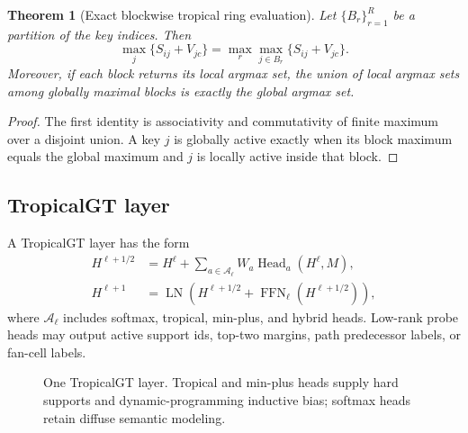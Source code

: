 \documentclass[11pt]{article}
\newtheorem{theorem}[definition]{Theorem}
\newcommand{\calA}{\mathcal{A}}
\begin{document}
\begin{theorem}[Exact blockwise tropical ring evaluation]
Let \(\{B_r\}_{r=1}^R\) be a partition of the key indices.  Then
\begin{equation}
\max_{j}\{S_{ij}+V_{jc}\}=\max_r\max_{j\in B_r}\{S_{ij}+V_{jc}\}.
\end{equation}
Moreover, if each block returns its local argmax set, the union of local argmax sets among globally maximal blocks is exactly the global argmax set.
\end{theorem}
\begin{proof}
The first identity is associativity and commutativity of finite maximum over a disjoint union.  A key \(j\) is globally active exactly when its block maximum equals the global maximum and \(j\) is locally active inside that block.
\end{proof}

\subsection{TropicalGT layer}

A TropicalGT layer has the form
\begin{align}
H^{\ell+1/2}&=H^\ell+\sum_{a\in\calA_\ell} W_a\operatorname{Head}_a(H^\ell,M),\\
H^{\ell+1}&=\operatorname{LN}\left(H^{\ell+1/2}+\operatorname{FFN}_\ell(H^{\ell+1/2})\right),
\end{align}
where \(\calA_\ell\) includes softmax, tropical, min-plus, and hybrid heads.  Low-rank probe heads may output active support ids, top-two margins, path predecessor labels, or fan-cell labels.

\begin{figure}[h]
\centering
{}
\caption{One TropicalGT layer.  Tropical and min-plus heads supply hard supports and dynamic-programming inductive bias; softmax heads retain diffuse semantic modeling.}
\end{figure}
\end{document}
